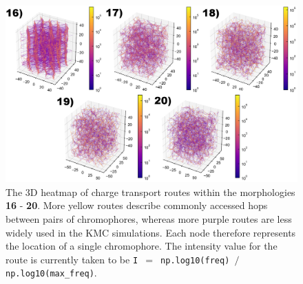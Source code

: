 \documentclass[12pt]{article}
\begin{document}
\begin{figure}[h!]\centering
	\includegraphics[width=\textwidth]{Figures/3dHoleOrig.png}
    \caption{The 3D heatmap of charge transport routes within the morphologies \textbf{16} - \textbf{20}.
    More yellow routes describe commonly accessed hops between pairs of chromophores, whereas more purple routes are less widely used in the KMC simulations.
    Each node therefore represents the location of a single chromophore.
The intensity value for the route is currently taken to be \texttt{I $=$ np.log10(freq) $/$ np.log10(max\_freq)}.}
	\label{fig:3dNetworkOrig}
\end{figure}
\end{document}

